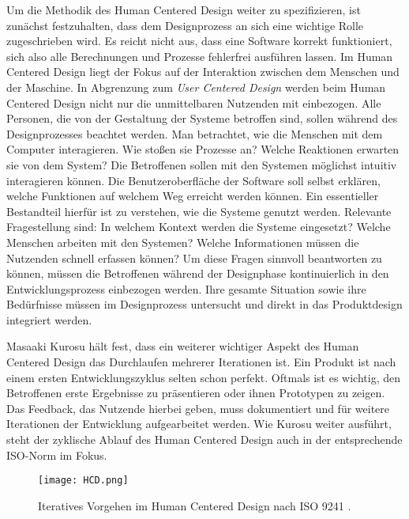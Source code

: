 Um die Methodik des Human Centered Design weiter zu spezifizieren, ist zunächst
festzuhalten, dass dem Designprozess an sich eine wichtige Rolle zugeschrieben
wird. Es reicht nicht aus, dass eine Software korrekt funktioniert, sich also
alle Berechnungen und Prozesse fehlerfrei ausführen lassen. Im Human Centered
Design liegt der Fokus auf der Interaktion zwischen dem Menschen und der
Maschine. In Abgrenzung zum \textit{User Centered Design} werden beim Human
Centered Design nicht nur die unmittelbaren Nutzenden mit einbezogen. Alle
Personen, die von der Gestaltung der Systeme betroffen sind, sollen während des
Designprozesses beachtet werden\cite{sequenceDiagrams}. Man betrachtet, wie die
Menschen mit dem Computer interagieren. Wie stoßen sie Prozesse an? Welche
Reaktionen erwarten sie von dem System? Die Betroffenen sollen mit den Systemen
möglichst intuitiv interagieren können. Die Benutzeroberfläche der Software
soll selbst erklären, welche Funktionen auf welchem Weg erreicht werden können.
Ein essentieller Bestandteil hierfür ist zu verstehen, wie die Systeme genutzt
werden. Relevante Fragestellung sind: In welchem Kontext werden die
Systeme eingesetzt? Welche Menschen arbeiten mit den Systemen? Welche
Informationen müssen die Nutzenden schnell erfassen können? Um diese Fragen
sinnvoll beantworten zu können, müssen die Betroffenen während der Designphase
kontinuierlich in den Entwicklungsprozess einbezogen werden. Ihre gesamte
Situation sowie ihre Bedürfnisse müssen im Designprozess untersucht und direkt
in das Produktdesign integriert werden\cite{hci}.

Masaaki Kurosu hält fest, dass ein weiterer wichtiger Aspekt des Human Centered
Design das Durchlaufen mehrerer Iterationen ist. Ein Produkt ist nach einem ersten
Entwicklungszyklus selten schon perfekt. Oftmals ist es wichtig, den Betroffenen
erste Ergebnisse zu präsentieren oder ihnen Prototypen zu zeigen. Das Feedback,
das Nutzende hierbei geben, muss dokumentiert und für weitere Iterationen der
Entwicklung aufgearbeitet werden. Wie Kurosu weiter ausführt, steht der
zyklische Ablauf des Human Centered Design auch in der entsprechende ISO-Norm
im Fokus\cite{kurosuHCI}.

\begin{figure}[H]
    \caption{Iteratives Vorgehen im Human Centered Design nach ISO 9241 \cite{ISO9241Graphic}.}
    \label{fig:iso-diagram}
    \centering
    \texttt{[image: HCD.png]}
\end{figure}

